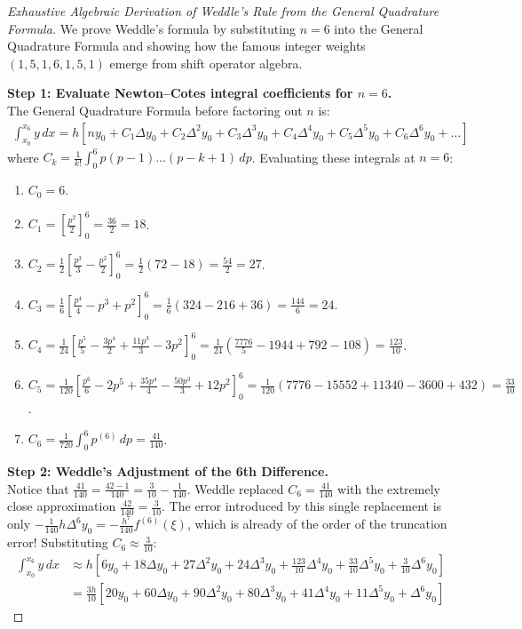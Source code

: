 \begin{proof}[Exhaustive Algebraic Derivation of Weddle's Rule from the General Quadrature Formula]
We prove Weddle's formula by substituting $n = 6$ into the General Quadrature Formula and showing how the famous integer weights $(1, 5, 1, 6, 1, 5, 1)$ emerge from shift operator algebra.

\medskip
\noindent\textbf{Step 1: Evaluate Newton--Cotes integral coefficients for $n = 6$.} \\
The General Quadrature Formula before factoring out $n$ is:
\begin{align}
    \int_{x_0}^{x_6} y \, dx = h \left[ n y_0 + C_1 \Delta y_0 + C_2 \Delta^2 y_0 + C_3 \Delta^3 y_0 + C_4 \Delta^4 y_0 + C_5 \Delta^5 y_0 + C_6 \Delta^6 y_0 + \dots \right]
\end{align}
where $C_k = \frac{1}{k!} \int_0^6 p(p-1)\dots(p-k+1) \, dp$. Evaluating these integrals at $n = 6$:
\begin{enumerate}[noitemsep]
    \item $C_0 = 6$.
    \item $C_1 = \left[ \frac{p^2}{2} \right]_0^6 = \frac{36}{2} = 18$.
    \item $C_2 = \frac{1}{2} \left[ \frac{p^3}{3} - \frac{p^2}{2} \right]_0^6 = \frac{1}{2}(72 - 18) = \frac{54}{2} = 27$.
    \item $C_3 = \frac{1}{6} \left[ \frac{p^4}{4} - p^3 + p^2 \right]_0^6 = \frac{1}{6}(324 - 216 + 36) = \frac{144}{6} = 24$.
    \item $C_4 = \frac{1}{24} \left[ \frac{p^5}{5} - \frac{3p^4}{2} + \frac{11p^3}{3} - 3p^2 \right]_0^6 = \frac{1}{24}\left( \frac{7776}{5} - 1944 + 792 - 108 \right) = \frac{123}{10}$.
    \item $C_5 = \frac{1}{120} \left[ \frac{p^6}{6} - 2p^5 + \frac{35p^4}{4} - \frac{50p^3}{3} + 12p^2 \right]_0^6 = \frac{1}{120}(7776 - 15552 + 11340 - 3600 + 432) = \frac{33}{10}$.
    \item $C_6 = \frac{1}{720} \int_0^6 p^{(6)} \, dp = \frac{41}{140}$.
\end{enumerate}

\medskip
\noindent\textbf{Step 2: Weddle's Adjustment of the 6th Difference.} \\
Notice that $\frac{41}{140} = \frac{42 - 1}{140} = \frac{3}{10} - \frac{1}{140}$.
Weddle replaced $C_6 = \frac{41}{140}$ with the extremely close approximation $\frac{42}{140} = \frac{3}{10}$.
The error introduced by this single replacement is only $-\frac{1}{140} h \Delta^6 y_0 = -\frac{h^7}{140} f^{(6)}(\xi)$, which is already of the order of the truncation error!
Substituting $C_6 \approx \frac{3}{10}$:
\begin{align}
    \int_{x_0}^{x_6} y \, dx &\approx h \left[ 6 y_0 + 18 \Delta y_0 + 27 \Delta^2 y_0 + 24 \Delta^3 y_0 + \frac{123}{10} \Delta^4 y_0 + \frac{33}{10} \Delta^5 y_0 + \frac{3}{10} \Delta^6 y_0 \right] \nonumber \\
    &= \frac{3 h}{10} \left[ 20 y_0 + 60 \Delta y_0 + 90 \Delta^2 y_0 + 80 \Delta^3 y_0 + 41 \Delta^4 y_0 + 11 \Delta^5 y_0 + \Delta^6 y_0 \right]
\end{align}


\end{proof}
